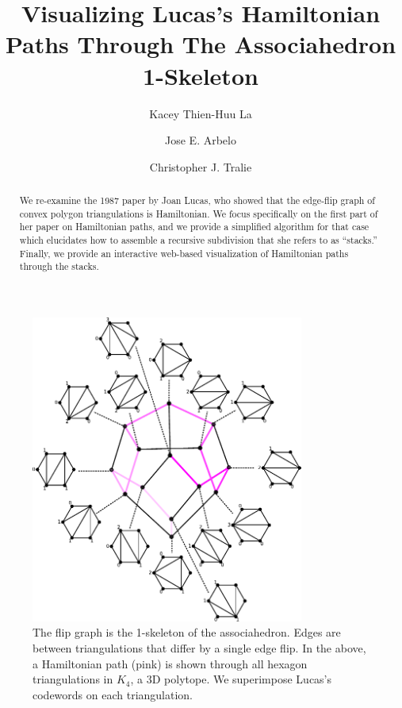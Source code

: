 \documentclass[english]{socg-lipics-v2021}
\title{Visualizing Lucas's Hamiltonian Paths Through The Associahedron 1-Skeleton}
\author{Kacey Thien-Huu La}{Ursinus College Mathematics And Computer Science, Collegeville, PA, USA }{}{}{}
\author{Jose E. Arbelo}{Ursinus College Mathematics And Computer Science, Collegeville, PA, USA }{}{}{}
\author{Christopher J. Tralie}{Ursinus College Mathematics And Computer Science, Collegeville, PA, USA \url{https://www.ctralie.com} }{ctralie@alumni.princeton.edu}{https://orcid.org/0000-0003-4206-1963}{}
\begin{document}
\maketitle
\begin{abstract}
    
We re-examine the 1987 paper by Joan Lucas\cite{lucas1987rotation}, who showed that the edge-flip graph of convex polygon triangulations is Hamiltonian.  We focus specifically on the first part of her paper on Hamiltonian paths, and we provide a simplified algorithm for that case which elucidates how to assemble a recursive subdivision that she refers to as ``stacks.''  Finally, we provide an interactive web-based visualization of Hamiltonian paths through the stacks.

\end{abstract}

\begin{figure}
    \centering
    \includegraphics[width=0.8\textwidth]{a4.pdf}
    \caption{The flip graph is the 1-skeleton of the associahedron.  Edges are between triangulations that differ by a single edge flip.  In the above, a Hamiltonian path (pink) is shown through all hexagon triangulations in $K_4$, a 3D polytope. We superimpose Lucas's codewords on each triangulation.}
    \label{fig:associahedron}
\end{figure}
\end{document}
